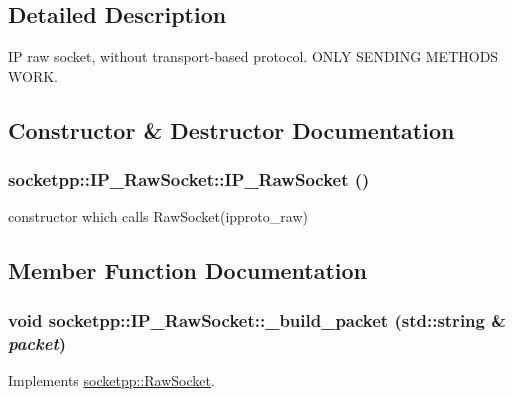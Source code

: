 \subsection{Detailed Description}
IP raw socket, without transport-based protocol. ONLY SENDING METHODS WORK. 

\subsection{Constructor \& Destructor Documentation}
\hypertarget{classsocketpp_1_1IP__RawSocket_e523748e7ca5bbcf7b74d804d356630e}{
\subsubsection[{IP\_\-RawSocket}]{\setlength{\rightskip}{0pt plus 5cm}socketpp::IP\_\-RawSocket::IP\_\-RawSocket ()}}
\label{classsocketpp_1_1IP__RawSocket_e523748e7ca5bbcf7b74d804d356630e}


constructor which calls RawSocket(ipproto\_\-raw) 



\subsection{Member Function Documentation}
\hypertarget{classsocketpp_1_1IP__RawSocket_6863cc399c543073e9aa3615c3f50940}{
\subsubsection[{\_\-build\_\-packet}]{\setlength{\rightskip}{0pt plus 5cm}void socketpp::IP\_\-RawSocket::\_\-build\_\-packet (std::string \& {\em packet})}}
\label{classsocketpp_1_1IP__RawSocket_6863cc399c543073e9aa3615c3f50940}




Implements \hyperlink{classsocketpp_1_1RawSocket_eb0a3f716c0fc46efa4123acf0fe1e66}{socketpp::RawSocket}.

